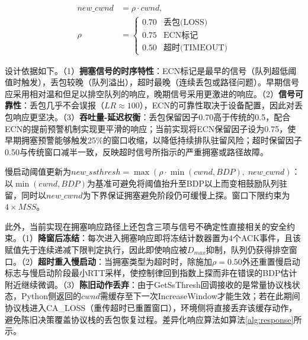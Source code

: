 \documentclass[10pt,twocolumn]{article}
\begin{document}
\begin{equation}
\begin{aligned}
new\_cwnd &= \rho \cdot cwnd, \\
\rho &= \begin{cases}
0.70 & \text{丢包(LOSS)} \\
0.75 & \text{ECN标记} \\
0.50 & \text{超时(TIMEOUT)}
\end{cases}
\end{aligned}
\end{equation}

设计依据如下。（1）\textbf{拥塞信号的时序特性}：ECN标记是最早的信号（队列超低阈值时触发），丢包较晚（队列溢出），超时最晚（连续丢包或路径问题）。早期信号应采用相对温和但足以排空队列的响应，晚期信号采用更激进的响应。（2）\textbf{信号可靠性}：丢包几乎不会误报（$LR \approx 100$），ECN的可靠性取决于设备配置，因此对丢包响应更坚决。（3）\textbf{吞吐量-延迟权衡}：丢包保留因子0.70高于传统的0.5，配合ECN的提前预警机制实现更平滑的响应；当前实现将ECN保留因子设为0.75，使早期拥塞预警能够触发25\%的窗口收缩，以降低持续排队驻留风险；超时保留因子0.50与传统窗口减半一致，反映超时信号所指示的严重拥塞或路径故障。

慢启动阈值更新为$new\_ssthresh = \max(\rho \cdot \min(cwnd, BDP), \; new\_cwnd)$：以$\min(cwnd, BDP)$为基准可避免将阈值抬升至BDP以上而变相鼓励队列驻留，同时以$new\_cwnd$为下界保证拥塞避免阶段仍可缓慢上探。窗口下限约束为$4 \times MSS$。

此外，当前实现在拥塞响应路径上还包含三项与信号不确定性直接相关的安全约束。（1）\textbf{降窗后冻结}：每次进入拥塞响应即将冻结计数器置为4个ACK事件，且该赋值先于连续递减下限判定执行，因此即使响应被$D_{max}$抑制，队列仍获得排空窗口。（2）\textbf{超时重入慢启动}：当拥塞类型为超时时，除施加$\rho=0.50$外还重置慢启动标志与慢启动阶段最小RTT采样，使控制律回到指数上探而非在错误的BDP估计附近继续微调。（3）\textbf{陈旧动作丢弃}：由于GetSsThresh回调接收的是常量协议栈状态，Python侧返回的$cwnd$需缓存至下一次IncreaseWindow才能生效；若在此期间协议栈进入CA\_LOSS（重传超时已重置窗口），环境侧将直接丢弃该缓存动作，避免陈旧决策覆盖协议栈的丢包恢复过程。差异化响应算法如算法\ref{alg:response}所示。
\end{document}
